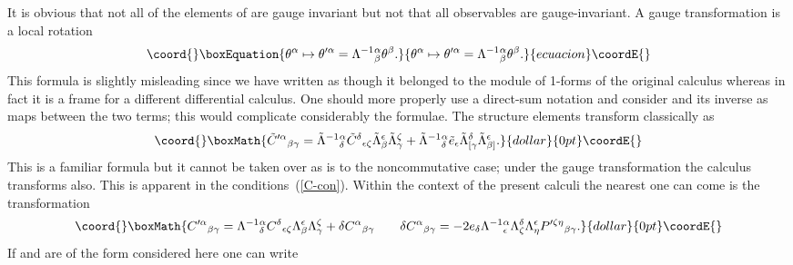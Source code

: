 \documentclass[12pt,a4paper]{article}
\newcounter{eg}
\def\t#1{\tilde #1}
\def\c#1{{\cal #1}}
\begin{document}
It is obvious that not all of the elements of \myHighlight{$\c{A}$}\coordHE{} are gauge
invariant but not that all observables are gauge-invariant.  A gauge
transformation is a local rotation
\begin{equation}\coord{}\boxEquation{
\theta^\alpha \mapsto \theta^{\prime\alpha} =
\Lambda^{-1}{}^\alpha_\beta \theta^\beta.            \label{lr}
}{
\theta^\alpha \mapsto \theta^{\prime\alpha} =
\Lambda^{-1}{}^\alpha_\beta \theta^\beta.            }{ecuacion}\coordE{}\end{equation}
This formula is slightly misleading since we have written
\myHighlight{$\theta^{\prime\alpha}$}\coordHE{} as though it belonged to the module of 1-forms
of the original calculus whereas in fact it is a frame for a different
differential calculus. One should more properly use a direct-sum
notation and consider \myHighlight{$\Lambda^\alpha_\beta$}\coordHE{} and its inverse as maps
between the two terms; this would complicate considerably the formulae.
The structure elements transform classically as
$$\coord{}\boxMath{
\t{C}^{\prime\alpha}{}_{\beta\gamma} = \t{\Lambda}^{-1}{}^\alpha_\delta
\t{C}^{\delta}{}_{\epsilon\zeta} \t{\Lambda}^\epsilon_\beta
\t{\Lambda}^\zeta_\gamma + 
\t{\Lambda}^{-1}{}^\alpha_\delta \t{e}_\epsilon
\t{\Lambda}^\delta_{[\gamma} \t{\Lambda}^\epsilon_{\beta]}.
}{dollar}{0pt}\coordE{}$$
This is a familiar formula but it cannot be taken over as is to the
noncommutative case; under the gauge transformation the calculus
transforms also. This is apparent in the conditions~(\ref{C-con}).
Within the context of the present calculi the nearest one can come is
the transformation
$$\coord{}\boxMath{
C^{\prime\alpha}{}_{\beta\gamma} = \Lambda^{-1}{}^\alpha_\delta
C^{\delta}{}_{\epsilon\zeta} \Lambda^\epsilon_\beta
\Lambda^\zeta_\gamma + \delta C^\alpha{}_{\beta\gamma} \qquad \delta
C^\alpha{}_{\beta\gamma} = - 2e_\delta\Lambda^{-1}{}^\alpha_\epsilon
\Lambda^\delta_\zeta \Lambda^\epsilon_\eta
P^{\prime\zeta\eta}{}_{\beta\gamma}.
}{dollar}{0pt}\coordE{}$$
If \coordHE{} and \coordHE{} are of the form considered here one can write
\end{document}

